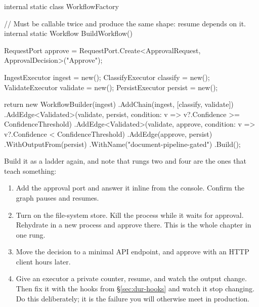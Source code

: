 \begin{csharp}[caption={The gated pipeline}, label={lst:dur-pipeline}]
internal static class WorkflowFactory
{
    // Must be callable twice and produce the same shape: resume depends on it.
    internal static Workflow BuildWorkflow()
    {
        RequestPort approve =
            RequestPort.Create<ApprovalRequest, ApprovalDecision>("Approve");

        IngestExecutor   ingest   = new();
        ClassifyExecutor classify = new();
        ValidateExecutor validate = new();
        PersistExecutor  persist  = new();

        return new WorkflowBuilder(ingest)
            .AddChain(ingest, [classify, validate])
            .AddEdge<Validated>(validate, persist,
                condition: v => v?.Confidence >= ConfidenceThreshold)
            .AddEdge<Validated>(validate, approve,
                condition: v => v?.Confidence < ConfidenceThreshold)
            .AddEdge(approve, persist)
            .WithOutputFrom(persist)
            .WithName("document-pipeline-gated")
            .Build();
    }
}
\end{csharp}

Build it as a ladder again, and note that rungs two and four are the ones that
teach something:

\begin{enumerate}[leftmargin=1.4em]
\item Add the approval port and answer it inline from the console. Confirm the
      graph pauses and resumes.
\item Turn on the file-system store. Kill the process while it waits for
      approval. Rehydrate in a new process and approve there. This is the whole
      chapter in one rung.
\item Move the decision to a minimal API endpoint, and approve with an HTTP
      client hours later.
\item Give an executor a private counter, resume, and watch the output change.
      Then fix it with the hooks from \S\ref{sec:dur-hooks} and watch it stop
      changing. Do this deliberately; it is the failure you will otherwise meet
      in production.
\end{enumerate}


